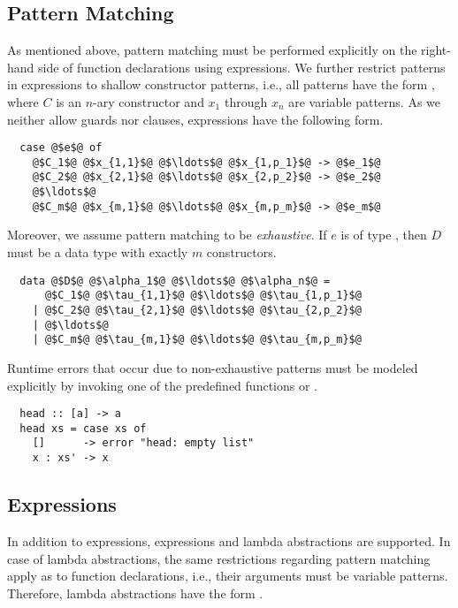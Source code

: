 \subsection{Pattern Matching} \label{sec:preliminaries:assumptions:pattern-matching}
As mentioned above, pattern matching must be performed explicitly on the right-hand side of function declarations using  expressions.
We further restrict patterns in  expressions to shallow constructor patterns, i.e., all patterns have the form , where $C$ is an $n$-ary constructor and $x_1$ through $x_n$ are variable patterns.
As we neither allow guards nor  clauses,  expressions have the following form.
\begin{verbatim}
  case @$e$@ of
    @$C_1$@ @$x_{1,1}$@ @$\ldots$@ @$x_{1,p_1}$@ -> @$e_1$@
    @$C_2$@ @$x_{2,1}$@ @$\ldots$@ @$x_{2,p_2}$@ -> @$e_2$@
    @$\ldots$@
    @$C_m$@ @$x_{m,1}$@ @$\ldots$@ @$x_{m,p_m}$@ -> @$e_m$@
\end{verbatim}
Moreover, we assume pattern matching to be \textit{exhaustive}.
If $e$ is of type , then $D$ must be a data type with exactly $m$ constructors.
\begin{verbatim}
  data @$D$@ @$\alpha_1$@ @$\ldots$@ @$\alpha_n$@ =
      @$C_1$@ @$\tau_{1,1}$@ @$\ldots$@ @$\tau_{1,p_1}$@
    | @$C_2$@ @$\tau_{2,1}$@ @$\ldots$@ @$\tau_{2,p_2}$@
    | @$\ldots$@
    | @$C_m$@ @$\tau_{m,1}$@ @$\ldots$@ @$\tau_{m,p_m}$@
\end{verbatim}
Runtime errors that occur due to non-exhaustive patterns must be modeled explicitly by invoking one of the predefined functions  or .
\begin{verbatim}
  head :: [a] -> a
  head xs = case xs of
    []      -> error "head: empty list"
    x : xs' -> x
\end{verbatim}

\subsection{Expressions} \label{sec:preliminaries:assumptions:expressions}
In addition to  expressions,  expressions and lambda abstractions are supported.
In case of lambda abstractions, the same restrictions regarding pattern matching apply as to function declarations, i.e., their arguments must be variable patterns.
Therefore, lambda abstractions have the form .

